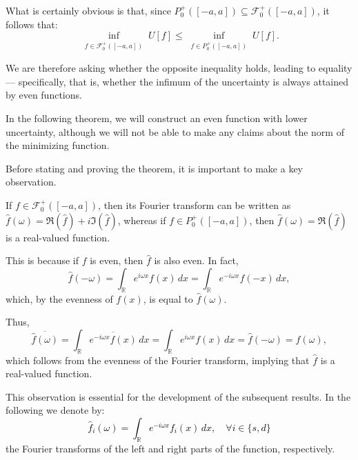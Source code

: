 \documentclass[preprint,hidelinks,authoryear]{elsarticle}
\theoremstyle{plain}
\theoremstyle{definition}
\theoremstyle{remark}
\begin{document}


What is certainly obvious is that, since $ P_0^+([-a,a]) \subseteq \mathcal{F}_0^+([-a,a]) $, it follows that:  
\begin{equation}  
    \inf_{\substack{f \in \mathcal{F}_{0}^+([-a,a])}} U[f] \leq \inf_{\substack{f \in P_0^+([-a,a])}} U[f]  .
\end{equation}


We are therefore asking whether the opposite inequality holds, leading to equality --- specifically, that is, whether the infimum of the uncertainty is always attained by even functions.  

In the following theorem, we will construct an even function with lower uncertainty, although we will not be able to make any claims about the norm of the minimizing function. 



Before stating and proving the theorem, it is important to make a key observation.  

If $ f \in \mathcal{F}_{0}^+([-a,a]) $, then its Fourier transform can be written as $ \hat{f}(\omega) = \Re(\hat{f}) + i\Im(\hat{f}) $, whereas if $ f \in P_{0}^+([-a,a]) $, then $ \hat{f}(\omega) = \Re(\hat{f}) $ is a real-valued function.  

This is because if $ f $ is even, then $ \hat{f} $ is also even. In fact,  
$$
\hat{f}(-\omega) = \int_{\mathbb{R}} e^{i\omega x} f(x) \, dx = \int_{\mathbb{R}} e^{-i\omega x} f(-x) \, dx,
$$  
which, by the evenness of $ f(x) $, is equal to $ \hat{f}(\omega) $.  

Thus,  
$$
\overline{\hat{f}(\omega)} = \int_{\mathbb{R}} \overline{e^{-i\omega x} f(x)} \, dx = \int_{\mathbb{R}} e^{i\omega x} f(x) \, dx = \hat{f}(-\omega) = \hat{f}(\omega),
$$  
which follows from the evenness of the Fourier transform, implying that $ \hat{f} $ is a real-valued function.  




This observation is essential for the development of the subsequent results. In the following we denote by:
\textcolor{black}{
\begin{equation}
    \hat{f}_i(\omega) = \int_{\mathbb{R}} e^{-i\omega x} f_i(x) \, dx, \quad \forall i \in \{s, d\}
\end{equation}
}
the Fourier transforms of the left and right parts of the function, respectively.
\end{document}
